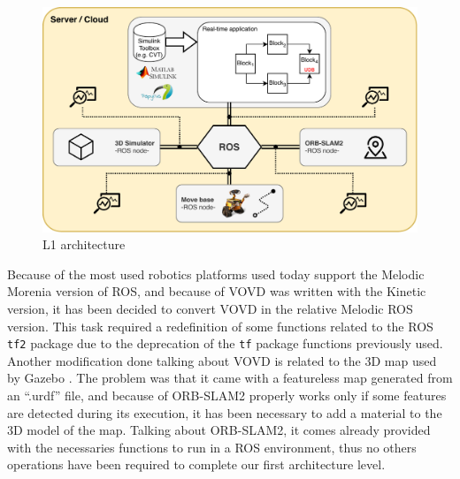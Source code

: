 \begin{figure}
	\centering
	\includegraphics[width=\textwidth]{images/L1-arch}
	\caption{L1 architecture}
	\label{fig:l1archexp}
\end{figure}

Because of the most used robotics platforms used today support the Melodic Morenia \cite{rosmelodic} version of ROS, and because of VOVD was written with the Kinetic version, it has been decided to convert VOVD in the relative Melodic ROS version. This task required a redefinition of some functions related to the ROS \texttt{tf2} package \cite{tfros} due to the deprecation of the \texttt{tf} package functions previously used. 
Another modification done talking about VOVD is related to the 3D map used by Gazebo \cite{Gazebo}. The problem was that it came with a featureless map generated from an ``.urdf'' file, and because of ORB-SLAM2 properly works only if some features are detected during its execution, it has been necessary to add a material to the 3D model of the map.
Talking about ORB-SLAM2, it comes already provided with the necessaries functions to run in a ROS environment, thus no others operations have been required to complete our first architecture level.



